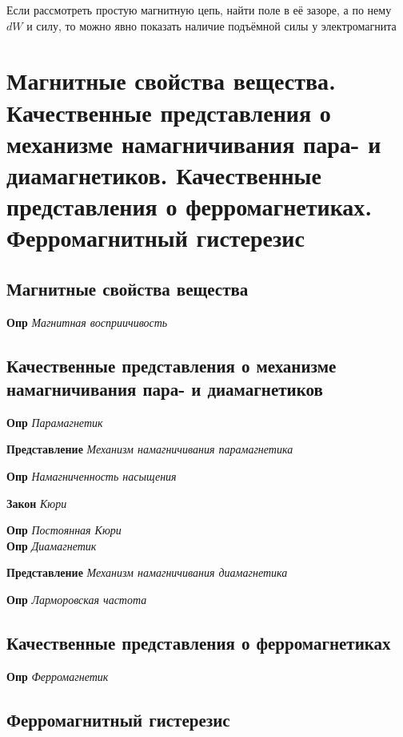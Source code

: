\documentclass[a4paper, 14pt]{article}
\begin{document}
    Если рассмотреть простую магнитную цепь, найти поле в её зазоре, а по нему $dW$ и силу, то можно явно показать
    наличие подъёмной силы у электромагнита
    
    \section{Магнитные свойства вещества.
    Качественные представления о механизме намагничивания пара- и диамагнетиков.
    Качественные представления о ферромагнетиках.
    Ферромагнитный гистерезис}
    
    \subsection{Магнитные свойства вещества}
    
    \textbf{Опр} \textit{Магнитная восприичивость}
    
    \subsection{Качественные представления о механизме намагничивания пара- и диамагнетиков}
    
    \textbf{Опр} \textit{Парамагнетик}
    
    \textbf{Представление} \textit{Механизм намагничивания парамагнетика}
    
    \textbf{Опр} \textit{Намагниченность насыщения}
    
    \textbf{Закон} \textit{Кюри}
    
    \textbf{Опр} \textit{Постоянная Кюри} \\
    
    \textbf{Опр} \textit{Диамагнетик}
    
    \textbf{Представление} \textit{Механизм намагничивания диамагнетика}
    
    \textbf{Опр} \textit{Ларморовская частота}
    
    \subsection{Качественные представления о ферромагнетиках}
    
    \textbf{Опр} \textit{Ферромагнетик}
    
    \subsection{Ферромагнитный гистерезис}
    
\end{document}

